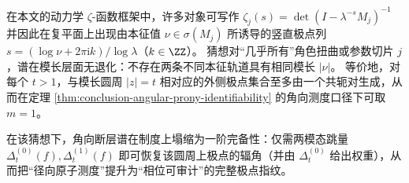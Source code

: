 \begin{conjecture}[单占据极点圆与一阶模态完备性]\label{conj:conclusion-single-occupied-pole-circle-first-order-completeness}
在本文的动力学 \(\zeta\)-函数框架中，许多对象可写作
\(
\zeta_j(s)=\det(I-\lambda^{-s}M_j)^{-1}
\)
并因此在复平面上出现由本征值 \(\nu\in\sigma(M_j)\) 所诱导的竖直极点列
\(
s=(\log\nu+2\pi\mathrm{i}k)/\log\lambda
\)（\(k\in\ZZ\)）。
猜想对“几乎所有”角色扭曲或参数切片 \(j\)，谱在模长层面无退化：不存在两条不同本征轨道具有相同模长 \(|\nu|\)。
等价地，对每个 \(t>1\)，与模长圆周 \(|z|=t\) 相对应的外侧极点集合至多由一个共轭对生成，从而在定理 \ref{thm:conclusion-angular-prony-identifiability} 的角向测度口径下可取 \(m=1\)。
\par
在该猜想下，角向断层谱在制度上塌缩为一阶完备性：仅需两模态跳量 \(\Delta_t^{(0)}(f),\Delta_t^{(1)}(f)\) 即可恢复该圆周上极点的辐角（并由 \(\Delta_t^{(0)}\) 给出权重），从而把“径向原子测度”提升为“相位可审计”的完整极点指纹。
\end{conjecture}

\endinput
